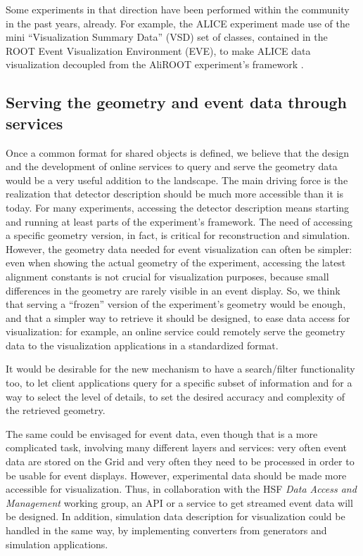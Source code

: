 \documentclass[12pt,a4paper]{article}
\begin{document}
Some experiments in that direction have been performed within the community in the past years, already. For example, the
ALICE experiment made use of the mini ``Visualization Summary Data'' (VSD) set of classes, contained in the ROOT Event
Visualization Environment (EVE), to make ALICE data visualization decoupled from the AliROOT experiment’s framework \cite{TadelALICE}.

\hypertarget{serving-data}{%
\subsection{Serving the geometry and event data through services}\label{serving-data}}

Once a common format for shared objects is defined, we believe that the design and the development of online services to query and serve the geometry
data would be a very useful addition to the landscape. %
The main driving force is the realization that detector description should be much more accessible than it is today.
For many experiments, accessing the detector description means starting and running at least parts of the experiment’s framework. The need of accessing a specific geometry version, in fact, is critical for reconstruction and simulation. However, the geometry
data needed for event visualization can often be simpler: even when showing the actual geometry of the experiment, accessing the latest
alignment constants is not crucial for visualization purposes, because small differences in the geometry are rarely visible in an event display.
So, we think that serving a “frozen” version of the experiment’s geometry would be enough, and that a simpler way to retrieve it
should be designed, to ease data access for visualization: for example, an online service could remotely serve the geometry data to the visualization applications in a standardized format.

It would be desirable for the new mechanism to have a search/filter functionality too, to let client applications query for a specific
subset of information and for a way to select the level of details, to set the desired accuracy and complexity of the retrieved geometry.

The same could be envisaged for event data, even though that is a more complicated task, involving many different layers and services:
very often event data are stored on the Grid and very often they need to be processed in order to be usable for event displays.
However, experimental data should be made more accessible for visualization. Thus, in collaboration with
the HSF \textit{Data Access and Management} working group, an API or a service to get streamed event data will be designed.
In addition, simulation data description for visualization could be handled in the same way, by implementing converters from
generators and simulation applications.
\end{document}
